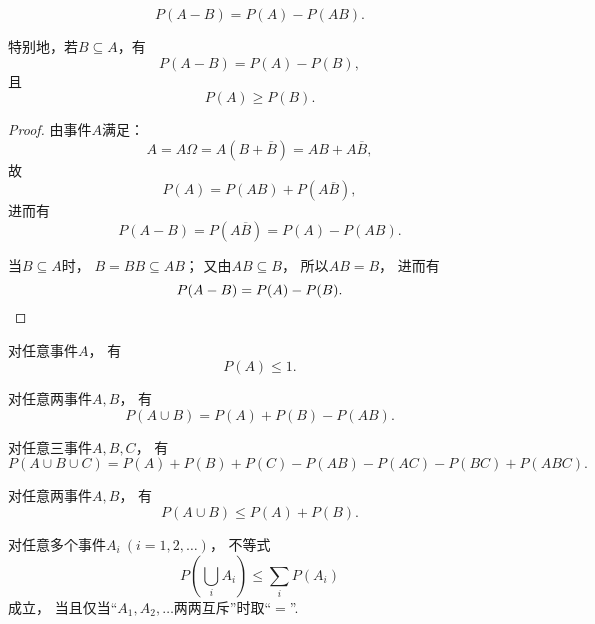 \begin{property}[概率的减法]
\begin{equation}
	P(A - B) = P(A) - P(AB).
\end{equation}

特别地，若\(B \subseteq A\)，有
\begin{equation}
	P(A - B) = P(A) - P(B),
\end{equation}
且
\begin{equation}
	P(A) \geq P(B).
\end{equation}
\begin{proof}
由事件\(A\)满足：\[
	A = A \Omega
	= A(B+\overline{B})
	= AB+A\overline{B},
\]
故\[
	P(A) = P(AB)+P(A\overline{B}),
\]
进而有\[
	P(A-B) = P(A\overline{B}) = P(A) - P(AB).
\]

当\(B \subseteq A\)时，
\(B = BB \subseteq AB\)；
又由\(AB \subseteq B\)，
所以\(AB = B\)，
进而有\[
	P(A-B) = P(A) - P(B).
	\qedhere
\]
\end{proof}
\end{property}

\begin{property}
对任意事件\(A\)，
有\begin{equation}
	P(A) \leq 1.
\end{equation}
\end{property}

\begin{theorem}[概率的加法]
对任意两事件\(A,B\)，
有\begin{equation}
	P(A \cup B) = P(A) + P(B) - P(AB).
\end{equation}
\end{theorem}

\begin{corollary}
对任意三事件\(A,B,C\)，
有\begin{equation}
	P(A \cup B \cup C)
	= P(A) + P(B) + P(C)
	- P(AB) - P(AC) - P(BC)
	+ P(ABC).
\end{equation}
\end{corollary}

\begin{theorem}
对任意两事件\(A,B\)，
有\begin{equation}
	P(A \cup B) \leq P(A) + P(B).
\end{equation}
\end{theorem}

\begin{corollary}[布尔不等式]
对任意多个事件\(A_i\ (i=1,2,\dotsc)\)，
不等式\begin{equation}\label{equation:概率论基础.布尔不等式}
	P\left(\bigcup_i A_i\right)
	\leq
	\sum_i P(A_i)
\end{equation}
成立，
当且仅当“\(A_1,A_2,\dotsc\)两两互斥”时取“\(=\)”.
\end{corollary}
